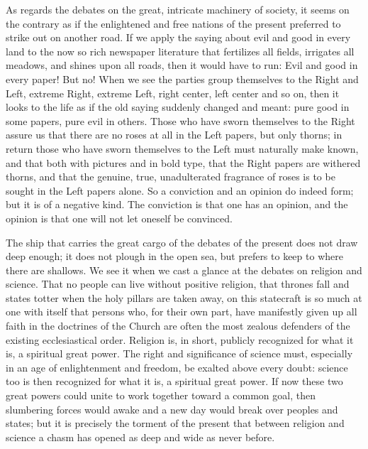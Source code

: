 \documentclass[12pt,a4paper,openany]{book}
\newcommand{\opage}[1]{\marginnote{\footnotesize\textit{[#1]}}}
\begin{document}
As regards the debates on the great, intricate
machinery of society, it seems on the contrary as
if the enlightened and free nations of the present preferred to strike
out on another road. If we apply the saying about
evil and good in every land to the now so rich newspaper
literature that fertilizes all fields, irrigates all meadows, and shines upon all roads,
then it would have to run: Evil and
good in every paper! But no! When we see the parties
group themselves to the Right and Left, extreme Right, extreme
Left, right center, left center and so on, then
it looks to the life as if the old saying
suddenly changed and meant: pure good in some
papers, pure evil in others. Those who have sworn themselves
to the Right assure us that there are no roses at all in the Left papers,
but only thorns; in return those who
have sworn themselves to the Left must naturally make known,
and that both with pictures and in bold type, that the 
\setcounter{footnote}{0}%
\opage{60}Right papers are withered thorns, and that the genuine, true, unadulterated
fragrance of roses is to be sought in the Left papers alone.
So a conviction and an
opinion do indeed form; but it is of a negative kind. The conviction
is that one has an opinion, and the opinion is that one
will not let oneself be convinced.

The ship that carries the great cargo of the debates of the present
does not draw deep enough; it does not plough in
the open sea, but prefers to keep to where there are shallows.
We see it when we cast a glance at the debates
on religion and science. That no people can live
without positive religion, that thrones fall and states totter
when the holy pillars are taken away, on this statecraft
is so much at one with itself that persons who,
for their own part, have manifestly given up all faith
in the doctrines of the Church are often the most zealous defenders
of the existing ecclesiastical order. Religion is,
in short, publicly recognized for what it is, a spiritual
great power. The right and significance of science must,
especially in an age of enlightenment and freedom, be exalted
above every doubt: science too is then recognized
for what it is, a spiritual great power. If
now these two great powers could unite to
work together toward a common goal, then slumbering
forces would awake and a new day would break over peoples
and states; but it is precisely the torment of the present that between
religion and science a chasm has opened
as deep and wide as never before.
\end{document}
